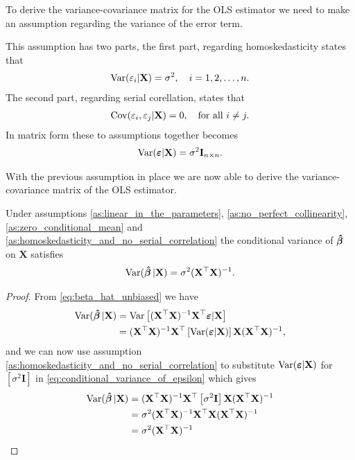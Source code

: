 To derive the variance-covariance matrix for the OLS estimator we need to make an assumption regarding the variance of the error term.
\begin{assumption}\label{as:homoskedasticity_and_no_serial_correlation}
    This assumption has two parts, the first part, regarding homoskedasticity states that
    \begin{align*}
       \operatorname{\text{Var}}(\varepsilon_i | \mathbf{X}) = \sigma^2, \quad i = 1,2, \ldots, n.
    \end{align*}
    The second part, regarding serial corellation, states that
    \begin{align*}
        \operatorname{\text{Cov}}(\varepsilon_i, \varepsilon_j | \mathbf{X}) = 0, \quad \text{for all} \ i \neq j.
    \end{align*}
    In matrix form these to assumptions together becomes
    \begin{align*}
        \operatorname{\text{Var}}(\boldsymbol{\varepsilon} | \mathbf{X}) = \sigma^2\mathbf{I}_{n\times n}.
    \end{align*}
\end{assumption}
With the previous assumption in place we are now able to derive the variance-covariance matrix of the OLS estimator.
\begin{theorem}\label{th:variance-covariance_of_the_ols_estimator}
    Under assumptions \ref{as:linear_in_the_parameters}, \ref{as:no_perfect_collinearity}, \ref{as:zero_conditional_mean} and \ref{as:homoskedasticity_and_no_serial_correlation} the conditional variance of $\operatorname{\boldsymbol{\hat{\beta}}}$ on $\mathbf{X}$ satisfies \cite[p. 811]{Wooldridge2012} 
    \begin{align*}
        \operatorname{\text{Var}}(\operatorname{\boldsymbol{\hat{\beta}}} | \mathbf{X}) = \sigma^2(\mathbf{X}^\top\mathbf{X})^{-1}.
    \end{align*}
\end{theorem}
\begin{proof}
    From \eqref{eq:beta_hat_unbiased} we have
    \begin{align}
        \operatorname{\text{Var}}(\operatorname{\boldsymbol{\hat{\beta}}} | \mathbf{X}) &= \operatorname{\text{Var}}\left[ (\mathbf{X}^\top\mathbf{X})^{-1}\mathbf{X}^\top\boldsymbol{\varepsilon}|\mathbf{X} \right] \nonumber\\
        &= (\mathbf{X}^\top\mathbf{X})^{-1}\mathbf{X}^\top\left[ \operatorname{\text{Var}}(\boldsymbol{\varepsilon} | \mathbf{X}) \right] \mathbf{X}(\mathbf{X}^\top\mathbf{X})^{-1}, \label{eq:conditional_variance_of_epsilon}
    \end{align}
    and we can now use assumption \ref{as:homoskedasticity_and_no_serial_correlation} to substitute $\operatorname{\text{Var}}(\boldsymbol{\varepsilon}|\mathbf{X})$ for $\left[\sigma^2 \mathbf{I}\right]$ in \eqref{eq:conditional_variance_of_epsilon} which gives
    \begin{align*}
        \operatorname{\text{Var}}(\operatorname{\boldsymbol{\hat{\beta}}} | \mathbf{X}) &= (\mathbf{X}^\top\mathbf{X})^{-1}\mathbf{X}^\top\left[\sigma^2 \mathbf{I}\right] \mathbf{X}(\mathbf{X}^\top\mathbf{X})^{-1} \\
        &= \sigma^2(\mathbf{X}^\top\mathbf{X})^{-1}\mathbf{X}^\top \mathbf{X}(\mathbf{X}^\top\mathbf{X})^{-1} \\
        &= \sigma^2(\mathbf{X}^\top\mathbf{X})^{-1}
    \end{align*}
\end{proof}
